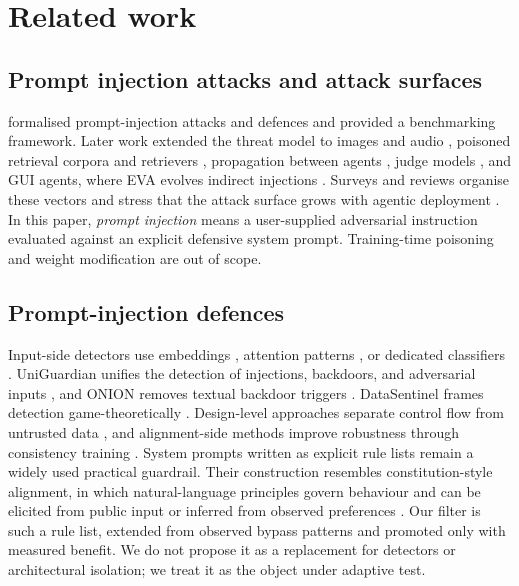 \documentclass[preprint,12pt,authoryear]{elsarticle}
\begin{document}
\section{Related work}
\label{sec:related}

\subsection{Prompt injection attacks and attack surfaces}
\citet{liu2024formalizing} formalised prompt-injection attacks and defences and provided a benchmarking framework. Later work extended the threat model to images and audio \citep{bagdasaryan2023abusing}, poisoned retrieval corpora and retrievers \citep{zou2025poisonedrag,clop2024backdoored}, propagation between agents \citep{lee2024infection}, judge models \citep{shi2024judge}, and GUI agents, where EVA evolves indirect injections \citep{lu2025eva}. Surveys and reviews organise these vectors and stress that the attack surface grows with agentic deployment \citep{kumar2024adversarial,gulyamov2026review,mchugh2025pi2,ivanusca2024impact}. In this paper, \emph{prompt injection} means a user-supplied adversarial instruction evaluated against an explicit defensive system prompt. Training-time poisoning and weight modification are out of scope.

\subsection{Prompt-injection defences}
Input-side detectors use embeddings \citep{ayub2024embedding}, attention patterns \citep{hung2025attention}, or dedicated classifiers \citep{jacob2024promptshield,ivry2025sentinel}. UniGuardian unifies the detection of injections, backdoors, and adversarial inputs \citep{lin2025uniguardian}, and ONION removes textual backdoor triggers \citep{qi2021onion}. DataSentinel frames detection game-theoretically \citep{liu2025datasentinel}. Design-level approaches separate control flow from untrusted data \citep{debenedetti2025defeating}, and alignment-side methods improve robustness through consistency training \citep{zhao2024consistency}. System prompts written as explicit rule lists remain a widely used practical guardrail. Their construction resembles constitution-style alignment, in which natural-language principles govern behaviour and can be elicited from public input \citep{huang2024collective} or inferred from observed preferences \citep{kostolansky2024icai,an2025icai}. Our filter is such a rule list, extended from observed bypass patterns and promoted only with measured benefit. We do not propose it as a replacement for detectors or architectural isolation; we treat it as the object under adaptive test.
\end{document}
